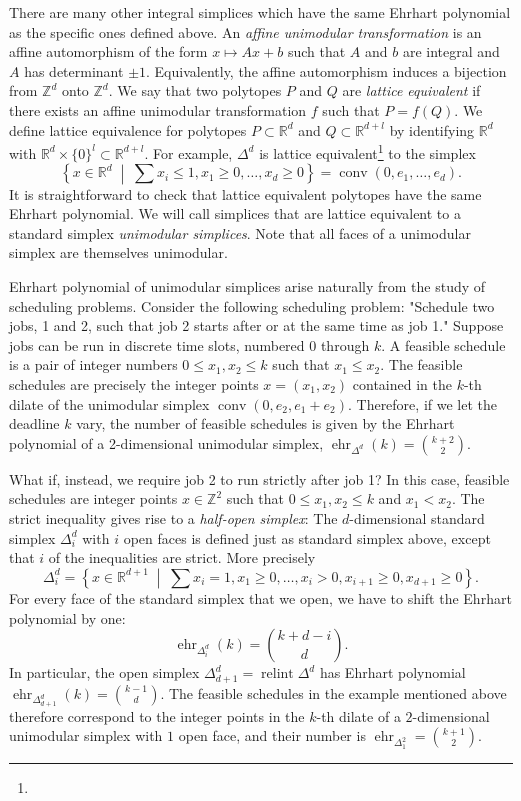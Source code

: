 \documentclass[12pt,reqno]{amsart}
\numberwithin{definition}{section}
\newcommand{\RR}{\mathbb{R}}
\newcommand{\ZZ}{\mathbb{Z}}
\newcommand{\ehr}{\operatorname{ehr}}
\newcommand{\conv}{\operatorname{conv}}
\newcommand{\relint}{\operatorname{relint}}
\newcommand{\mset}[2]{ \left\{ #1 \; \middle| \; #2 \right\}}
\begin{document}
There are many other integral simplices which have the same Ehrhart polynomial as the specific ones defined above. An \emph{affine unimodular transformation} is an affine automorphism of the form $x \mapsto Ax + b$ such that $A$ and $b$ are integral and $A$ has determinant $\pm1$. Equivalently, the affine automorphism induces a bijection from $\ZZ^d$ onto $\ZZ^d$. We say that two polytopes $P$ and $Q$ are \emph{lattice equivalent} if there exists an affine unimodular transformation $f$ such that $P=f(Q)$. We define lattice equivalence for polytopes $P\subset \RR^d$ and $Q\subset \RR^{d+l}$ by identifying $\RR^d$ with $\RR^d\times\{0\}^l\subset \RR^{d+l}$. For example, $\Delta^d$ is lattice equivalent\footnote{} to the simplex
\[
  \mset{x\in\RR^{d}}{\sum x_i \leq 1, x_1 \geq 0, \ldots, x_{d} \geq 0} = \conv(0,e_1,\ldots,e_d).
\]  It is straightforward to check that lattice equivalent polytopes have the same Ehrhart polynomial. We will call simplices that are lattice equivalent to a standard simplex \emph{unimodular simplices}. Note that all faces of a unimodular simplex are themselves unimodular.

Ehrhart polynomial of unimodular simplices arise naturally from the study of scheduling problems. Consider the following scheduling problem: "Schedule two jobs, 1 and 2, such that job 2 starts after or at the same time as job 1." Suppose jobs can be run in discrete time slots, numbered $0$ through $k$. A feasible schedule is a pair of integer numbers $0\leq x_1,x_2 \leq k$ such that $x_1 \leq x_2$. The feasible schedules are precisely the integer points $x=(x_1,x_2)$ contained in the $k$-th dilate of the unimodular simplex $\conv(0,e_2,e_1+e_2)$. Therefore, if we let the deadline $k$ vary, the number of feasible schedules is given by the Ehrhart polynomial of a 2-dimensional unimodular simplex, $\ehr_{\Delta^d}(k)=\binom{k+2}{2}$.

What if, instead, we require job 2 to run strictly after job 1? In this case, feasible schedules are integer points $x\in\ZZ^2$ such that $0\leq x_1,x_2 \leq k$ and $x_1 < x_2$. The strict inequality gives rise to a \emph{half-open simplex}: The $d$-dimensional standard simplex $\Delta^d_i$ with $i$ open faces is defined just as standard simplex above, except that $i$ of the inequalities are strict. More precisely
\[
    \Delta^d_i = \mset{x\in\RR^{d+1}}{\sum x_i =1, x_1 \geq 0, \ldots, x_i > 0, x_{i+1} \geq 0, x_{d+1} \geq 0}.
\]
For every face of the standard simplex that we open, we have to shift the Ehrhart polynomial by one:
\[
  \ehr_{\Delta^d_i}(k) = \binom{k+d-i}{d}.
\]
In particular, the open simplex $\Delta^d_{d+1} = \relint{\Delta^d}$ has Ehrhart polynomial $\ehr_{\Delta^d_{d+1}}(k) = \binom{k-1}{d}$. The feasible schedules in the example mentioned above therefore correspond to the integer points in the $k$-th dilate of a $2$-dimensional unimodular simplex with $1$ open face, and their number is $\ehr_{\Delta^2_1} = \binom{k+1}{2}$.
\end{document}
